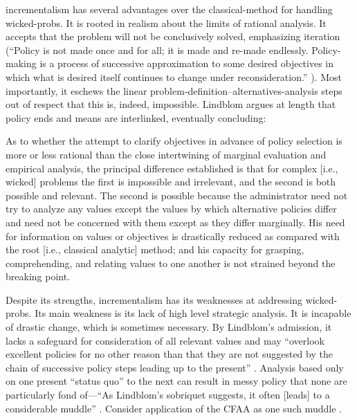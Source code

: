 \Ac{incrementalism} has several advantages over the \ac{classical-method} for handling \acp{wicked-prob}. It is rooted
in realism about the limits of rational analysis. It accepts that the problem will not be conclusively solved,
emphasizing iteration (``Policy is not made once and for all; it is made and re-made endlessly. Policy-making is a
process of successive approximation to some desired objectives in which what is desired itself continues to change under
reconsideration.'' \cite{lindblom_muddling_1959}). Most importantly, it eschews the linear
problem-definition--alternatives-analysis steps out of respect that this is, indeed, impossible. Lindblom argues at
length that policy ends and means are interlinked, eventually concluding:

\begin{displayquote}
As to whether the attempt to clarify objectives in advance of policy selection is more or less rational than the close
intertwining of marginal evaluation and empirical analysis, the principal difference established is that for complex
[i.e., wicked] problems the first is impossible and irrelevant, and the second is both possible and relevant. The second
is possible because the administrator need not try to analyze any values except the values by which alternative policies
differ and need not be concerned with them except as they differ marginally. His need for information on values or
objectives is drastically reduced as compared with the root [i.e., classical analytic] method; and his capacity for
grasping, comprehending, and relating values to one another is not strained beyond the breaking point.
\cite{lindblom_muddling_1959}
\end{displayquote}

Despite its strengths, \ac{incrementalism} has its weaknesses at addressing \acp{wicked-prob}. Its main weakness is its
lack of high level strategic analysis. It is incapable of drastic change, which is sometimes necessary. By Lindblom's
admission, it lacks a safeguard for consideration of all relevant values and may ``overlook excellent policies for no
other reason than that they are not suggested by the chain of successive policy steps leading up to the present''
\cite{lindblom_muddling_1959}. Analysis based only on one present ``status quo'' to the next can result in messy policy
that none are particularly fond of---``As Lindblom's sobriquet suggests, it often [leads] to a considerable muddle''
\cite{feeley_judicial_2000}. Consider application of the \acl{CFAA} as one such muddle \cite{wolff_computer_2016}.

